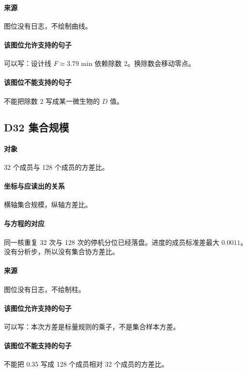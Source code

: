 \paragraph{来源}
图位没有日志，不绘制曲线。

\paragraph{该图位允许支持的句子}
可以写：设计线 $F\approx 3.79$ min 依赖除数 2。换除数会移动零点。

\paragraph{该图位不能支持的句子}
不能把除数 2 写成某一微生物的 $D$ 值。

\subsection{D32 集合规模}
\paragraph{对象}
32 个成员与 128 个成员的方差比。

\paragraph{坐标与应读出的关系}
横轴集合规模，纵轴方差比。

\paragraph{与方程的对应}
同一核重复 32 次与 128 次的停机分位已经落盘。进度的成员标准差最大 \(0.0011\)。没有分析步，所以没有集合协方差比。

\paragraph{来源}
图位没有日志，不绘制柱。

\paragraph{该图位允许支持的句子}
可以写：本次方差是标量规则的乘子，不是集合样本方差。

\paragraph{该图位不能支持的句子}
不能把 $0.35$ 写成 128 个成员相对 32 个成员的方差比。

